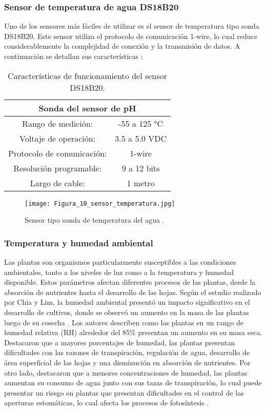 \subsubsection*{Sensor de temperatura de agua DS18B20}
Uno de los sensores más fáciles de utilizar es el sensor de temperatura tipo sonda DS18B20. Este sensor utiliza el protocolo de comunicación 1-wire, lo cual reduce considerablemente la complejidad de conexión y la transmisión de datos. A continuación se detallan sus características \cite{la_electronica_DS18B20}:

\begin{table}[H]
	\centering
	\begin{tabular}{|c|c|}
		\hline
		\multicolumn{2}{|c|}{\textbf{Sonda del sensor de pH}}\\ \hline
		Rango de medición: & -55 a 125 °C \\ \hline
		Voltaje de operación: & 3.5 a 5.0 VDC \\ \hline
		Protocolo de comunicación: & 1-wire \\ \hline
		Resolución programable: & 9 a 12 bits \\ \hline
		Largo de cable: & 1 metro \\ \hline
	\end{tabular}
	\caption{Características de funcionamiento del sensor DS18B20.}
	\label{Cuadro4}
\end{table}

\begin{figure}[H]
	\centering
	\texttt{[image: Figura\_10\_sensor\_temperatura.jpg]}
	\caption{Sensor tipo sonda de temperatura del agua \cite{la_electronica_DS18B20}.}
	\label{fig:mesh10}
\end{figure}

\subsubsection*{Temperatura y humedad ambiental}
Las plantas son organismos particularmente susceptibles a las condiciones ambientales, tanto a los niveles de luz como a la temperatura y humedad disponible. Estos parámetros afectan diferentes procesos de las plantas, desde la absorción de nutrientes hasta el desarrollo de las hojas. Según el estudio realizado por Chia y Lim, la humedad ambiental presentó un impacto significativo en el desarrollo de cultivos, donde se observó un aumento en la masa de las plantas luego de su cosecha \cite{chia_critical_2022}. Los autores describen como las plantas en un rango de humedad relativa (RH) alrededor del 85\% presentan un aumento en su masa seca. Destacaron que a mayores porcentajes de humedad, las plantas presentan dificultades con las razones de transpiración, regulación de agua, desarrollo de área superficial de las hojas y una disminución en absorción de nutrientes. Por otro lado, destacaron que a menores concentraciones de humedad, las plantas aumentan su consumo de agua junto con sus tazas de transpiración, lo cual puede presentar un riesgo en plantas que presentan dificultades en el control de las aperturas estomáticas, lo cual afecta los procesos de fotosíntesis \cite{chia_critical_2022}.

